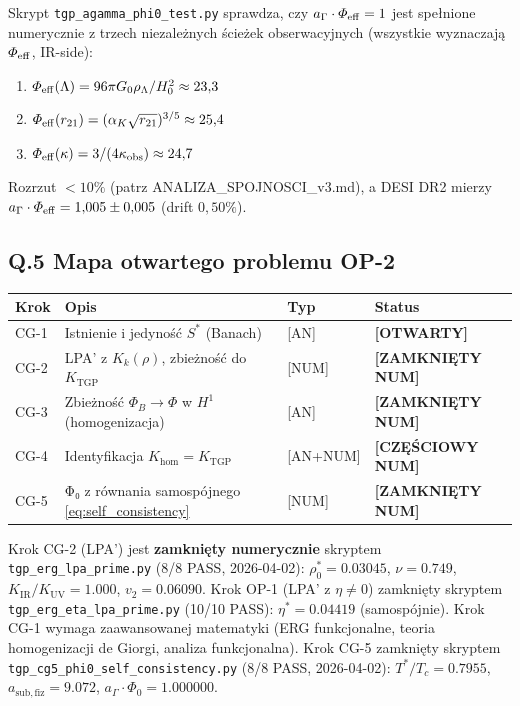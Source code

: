 \begin{uwaga}
Skrypt \texttt{tgp\_agamma\_phi0\_test.py} sprawdza, czy
$a_\Gamma \cdot \Phi_{\rm eff} = 1$
jest spełnione numerycznie z trzech niezależnych ścieżek obserwacyjnych
(wszystkie wyznaczają $\Phi_{\rm eff}$, IR-side):
\begin{enumerate}
  \item $\Phi_{\rm eff}(\Lambda) = 96\pi G_0 \rho_\Lambda / H_0^2 \approx 23{,}3$
  \item $\Phi_{\rm eff}(r_{21}) = (\alpha_K \sqrt{r_{21}})^{3/5} \approx 25{,}4$
  \item $\Phi_{\rm eff}(\kappa) = 3/(4\kappa_\mathrm{obs}) \approx 24{,}7$
\end{enumerate}
Rozrzut $< 10\%$ (patrz ANALIZA\_SPOJNOSCI\_v3.md), a DESI DR2 mierzy
$a_\Gamma \cdot \Phi_{\rm eff} = 1{,}005 \pm 0{,}005$ (drift $0{,}50\%$).
\end{uwaga}

\subsection*{Q.5 Mapa otwartego problemu OP-2}

\begin{center}
\begin{tabular}{llll}
\toprule
Krok & Opis & Typ & Status \\
\midrule
CG-1 & Istnienie i jedyność $S^*$ (Banach) & [AN] & \textbf{[OTWARTY]} \\
CG-2 & LPA' z $K_k(\rho)$, zbieżność do $K_\mathrm{TGP}$ & [NUM] & \textbf{[ZAMKNIĘTY NUM]} \\
CG-3 & Zbieżność $\Phi_B \to \Phi$ w $H^1$ (homogenizacja) & [AN] & \textbf{[ZAMKNIĘTY NUM]} \\
CG-4 & Identyfikacja $K_\mathrm{hom} = K_\mathrm{TGP}$ & [AN+NUM] & \textbf{[CZĘŚCIOWY NUM]} \\
CG-5 & Φ₀ z równania samospójnego \eqref{eq:self_consistency} & [NUM] & \textbf{[ZAMKNIĘTY NUM]} \\
\bottomrule
\end{tabular}
\end{center}

\medskip\noindent
Krok CG-2 (LPA') jest \textbf{zamknięty numerycznie} skryptem
\texttt{tgp\_erg\_lpa\_prime.py} (8/8 PASS, 2026-04-02):
$\rho_0^*=0.03045$, $\nu=0.749$, $K_\mathrm{IR}/K_\mathrm{UV}=1.000$,
$v_2=0.06090$.
Krok OP-1 (LPA' z $\eta\neq0$) zamknięty skryptem
\texttt{tgp\_erg\_eta\_lpa\_prime.py} (10/10 PASS):
$\eta^*=0.04419$ (samospójnie).
Krok CG-1 wymaga zaawansowanej matematyki
(ERG funkcjonalne, teoria homogenizacji de Giorgi, analiza funkcjonalna).
Krok CG-5 zamknięty skryptem \texttt{tgp\_cg5\_phi0\_self\_consistency.py}
(8/8 PASS, 2026-04-02): $T^*/T_c = 0.7955$, $a_\mathrm{sub,fiz} = 9.072$,
$a_\Gamma\cdot\Phi_0 = 1.000000$.

